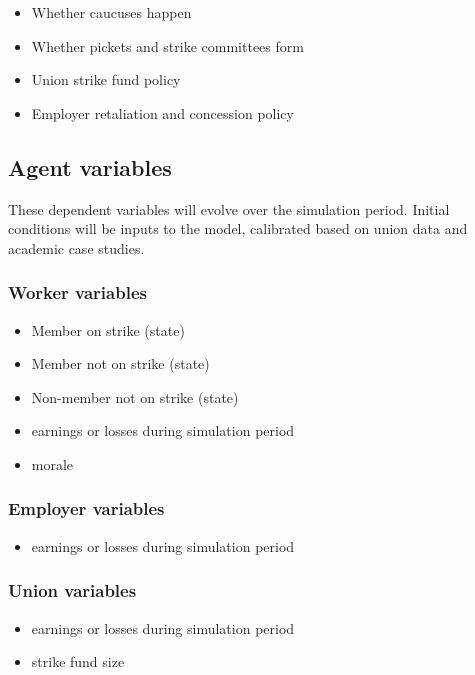 \documentclass[a4paper]{article}
\begin{document}
\begin{itemize}
    \item Whether caucuses happen
    \item Whether pickets and strike committees form
    \item Union strike fund policy
    \item Employer retaliation and concession policy
\end{itemize}

\subsection{Agent variables}

These dependent variables will evolve over the simulation period. Initial conditions will be inputs to the model, calibrated based on union data and academic case studies.

\subsubsection{Worker variables}
\begin{itemize}
    \item Member on strike (state)
    \item Member not on strike (state)
    \item Non-member not on strike (state)
    \item earnings or losses during simulation period
    \item morale
\end{itemize}

\subsubsection{Employer variables}
\begin{itemize}
    \item earnings or losses during simulation period
\end{itemize}

\subsubsection{Union variables}
\begin{itemize}
    \item earnings or losses during simulation period
    \item strike fund size
\end{itemize}
\end{document}
